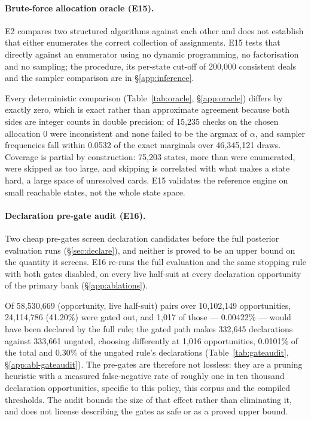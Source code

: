\documentclass[11pt]{article}
\theoremstyle{definition}
\newcommand{\numOracleStatesSkipped}{75{,}203}
\newcommand{\numOracleBestChecks}{15{,}235}
\newcommand{\numOracleBestBad}{0}
\newcommand{\numOracleSampleDiff}{0.0532}
\newcommand{\numOracleDraws}{46{,}345{,}121}
\newcommand{\numGateOpps}{10{,}102{,}149}
\newcommand{\numGateSeen}{58{,}530{,}669}
\newcommand{\numGateRejected}{24{,}114{,}786}
\newcommand{\numGateRejectedPct}{41.20}
\newcommand{\numGateFalseNeg}{1{,}017}
\newcommand{\numGateFalseNegPct}{0.00422}
\newcommand{\numGateActionsChanged}{1{,}016}
\newcommand{\numGateActionsPct}{0.0101}
\newcommand{\numGateDeclGated}{332{,}645}
\newcommand{\numGateDeclUngated}{333{,}661}
\newcommand{\numGateDeclLostPct}{0.30}
\newcommand{\numOracleMaxDeals}{200{,}000}
\begin{document}
\paragraph{Brute-force allocation oracle (E15).}
E2 compares two structured algorithms against each other and does not establish
that either enumerates the correct collection of assignments. E15 tests that
directly against an enumerator using no dynamic programming, no factorisation and
no sampling; the procedure, its per-state cut-off of \numOracleMaxDeals{}
consistent deals and the sampler comparison are in \S\ref{app:inference}.


Every deterministic comparison (Table~\ref{tab:oracle}, \S\ref{app:oracle}) differs by exactly zero,
which is exact rather than approximate agreement because both sides are integer
counts in double precision; of \numOracleBestChecks{} checks on the chosen
allocation \numOracleBestBad{} were inconsistent and none failed to be the argmax
of $\alpha$, and sampler frequencies fall within \numOracleSampleDiff{} of the
exact marginals over \numOracleDraws{} draws. Coverage is partial by construction: \numOracleStatesSkipped{} states,
more than were enumerated, were skipped as too large, and skipping is correlated
with what makes a state hard, a large space of unresolved cards. E15 validates
the reference engine on small reachable states, not the whole state space.

\paragraph{Declaration pre-gate audit (E16).}
Two cheap pre-gates screen declaration candidates before the full posterior
evaluation runs (\S\ref{sec:declare}), and neither is proved to be an upper bound
on the quantity it screens. E16 re-runs the full evaluation and the same stopping
rule with both gates disabled, on every live half-suit at every declaration
opportunity of the primary bank (\S\ref{app:ablations}).


Of \numGateSeen{} (opportunity, live half-suit) pairs over \numGateOpps{}
opportunities, \numGateRejected{} (\numGateRejectedPct\%) were gated out, and
\numGateFalseNeg{} of those --- \numGateFalseNegPct\% --- would have been
declared by the full rule; the gated path makes \numGateDeclGated{} declarations
against \numGateDeclUngated{} ungated, choosing differently at
\numGateActionsChanged{} opportunities, \numGateActionsPct\% of the total and
\numGateDeclLostPct\% of the ungated rule's declarations
(Table~\ref{tab:gateaudit}, \S\ref{app:abl-gateaudit}). The pre-gates are
therefore not lossless: they are a pruning heuristic with a measured
false-negative rate of roughly one in ten thousand declaration opportunities,
specific to this policy, this corpus and the compiled thresholds. The audit
bounds the size of that effect rather than eliminating it, and does not license
describing the gates as safe or as a proved upper bound.
\end{document}
